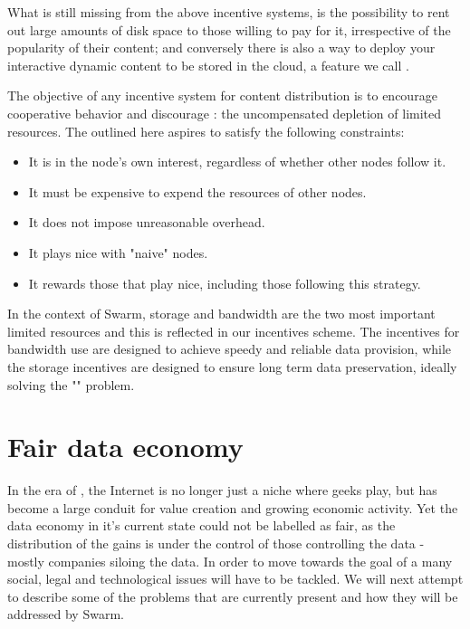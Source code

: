 What is still missing from the above incentive systems, is the possibility to rent out large amounts of disk space to those willing to pay for it, irrespective of the popularity of their content; and conversely there is also a way to deploy your interactive dynamic content to be stored in the cloud, a feature we call .

The objective of any incentive system for  content distribution is to encourage cooperative behavior and discourage : the uncompensated depletion of limited resources. The  outlined here aspires to satisfy the following constraints:

\begin{itemize}
    \item It is in the node's own interest, regardless of whether other nodes follow it.
    \item It must be expensive to expend the resources of other nodes.
    \item It does not impose unreasonable overhead.
    \item It plays nice with "naive" nodes.
    \item It rewards those that play nice, including those following this strategy.
\end{itemize}

In the context of Swarm, storage and bandwidth are the two most important limited resources and this is reflected in our incentives scheme. The incentives for bandwidth use are designed to achieve speedy and reliable data provision, while the storage incentives are designed to ensure long term data preservation, ideally solving the "" problem.

\section{Fair data economy  \statusgreen}\label{sec:fair-data}
\green{}

In the era of , the Internet is no longer just a niche where geeks play, but has become a large conduit for value creation and growing economic activity. Yet the data economy in it's current state could not be labelled as fair, as the distribution of the gains is under the control of those controlling the data - mostly companies siloing the data. In order to move towards the goal of a  many social, legal and technological issues will have to be tackled. We will next attempt to  describe some of the problems that are currently present and how they will be addressed by Swarm. 

